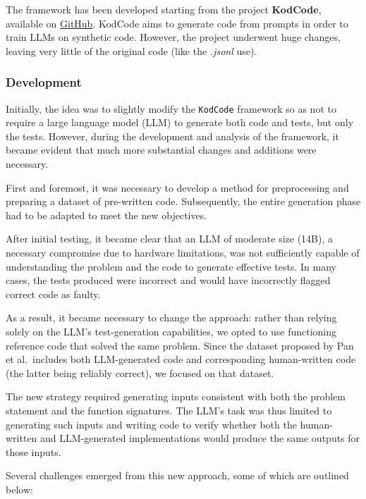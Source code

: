 The framework has been developed starting from the project \textbf{KodCode}\cite{xu2025kodcode}, 
available on \href{https://github.com/KodCode-AI/kodcode/tree/main}{GitHub}. 
KodCode aims to generate code from prompts in order to train LLMs on 
synthetic code. 
However, the project underwent huge changes, leaving very 
little of the original code (like the \textit{.jsonl} use).


\subsubsection{Development}
Initially, the idea was to slightly modify the \texttt{KodCode} 
framework so as not to require a large language model (LLM) 
to generate both code and tests, but only the tests. 
However, during the development and analysis of the 
framework, it became evident that much more substantial 
changes and additions were necessary.

First and foremost, it was necessary to develop a 
method for preprocessing and preparing a dataset of 
pre-written code. Subsequently, the entire generation 
phase had to be adapted to meet the new objectives.

After initial testing, it became clear that an LLM 
of moderate size (14B), a necessary compromise due to 
hardware limitations, was not sufficiently capable of 
understanding the problem and the code to generate 
effective tests. In many cases, the tests produced 
were incorrect and would have incorrectly flagged 
correct code as faulty.

As a result, it became necessary to change the 
approach: rather than relying solely on the LLM’s 
test-generation capabilities, we opted to use 
functioning reference code that solved the same problem. 
Since the dataset proposed by Pan et al.\ includes both 
LLM-generated code and corresponding human-written code 
(the latter being reliably correct), we focused on that 
dataset.

The new strategy required generating inputs consistent 
with both the problem statement and the function signatures. 
The LLM's task was thus limited to generating such inputs 
and writing code to verify whether both the human-written 
and LLM-generated implementations would produce the same 
outputs for those inputs.

Several challenges emerged from this new approach, some 
of which are outlined below:

